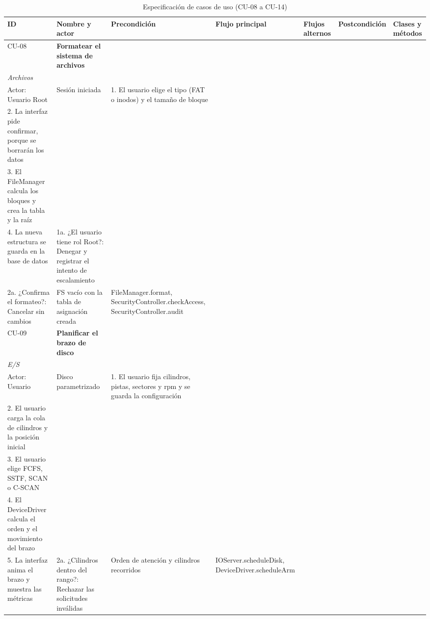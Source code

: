 \documentclass[conference]{IEEEtran}
\begin{document}
\begin{table}[!t]
\caption{Especificación de casos de uso (CU-08 a CU-14)}
\label{tab:cu2}
\scriptsize\renewcommand{\arraystretch}{1.05}\setlength{\tabcolsep}{2pt}
\begin{tabular}{|>{\raggedright}p{0.8cm}|>{\raggedright}p{2.1cm}|>{\raggedright}p{1.7cm}|>{\raggedright}p{4.7cm}|>{\raggedright}p{2.9cm}|>{\raggedright}p{1.8cm}|>{\raggedright}p{2.9cm}|}
\hline
\textbf{ID} & \textbf{Nombre y actor} & \textbf{Precondición} & \textbf{Flujo principal} & \textbf{Flujos alternos} & \textbf{Postcondición} & \textbf{Clases y métodos}\tabularnewline \hline
CU-08 & \textbf{Formatear el sistema de archivos}\\ \textit{Archivos}\\ Actor: Usuario Root & Sesión iniciada & 1. El usuario elige el tipo (FAT o inodos) y el tamaño de bloque\\ 2. La interfaz pide confirmar, porque se borrarán los datos\\ 3. El FileManager calcula los bloques y crea la tabla y la raíz\\ 4. La nueva estructura se guarda en la base de datos & 1a. ¿El usuario tiene rol Root?: Denegar y registrar el intento de escalamiento\\ 2a. ¿Confirma el formateo?: Cancelar sin cambios & FS vacío con la tabla de asignación creada & FileManager.\allowbreak format, SecurityController.\allowbreak checkAccess, SecurityController.\allowbreak audit\tabularnewline \hline
CU-09 & \textbf{Planificar el brazo de disco}\\ \textit{E/S}\\ Actor: Usuario & Disco parametrizado & 1. El usuario fija cilindros, pistas, sectores y rpm y se guarda la configuración\\ 2. El usuario carga la cola de cilindros y la posición inicial\\ 3. El usuario elige FCFS, SSTF, SCAN o C-SCAN\\ 4. El DeviceDriver calcula el orden y el movimiento del brazo\\ 5. La interfaz anima el brazo y muestra las métricas & 2a. ¿Cilindros dentro del rango?: Rechazar las solicitudes inválidas & Orden de atención y cilindros recorridos & IOServer.\allowbreak scheduleDisk, DeviceDriver.\allowbreak scheduleArm\tabularnewline \hline

\end{tabular}
\end{table}
\end{document}
